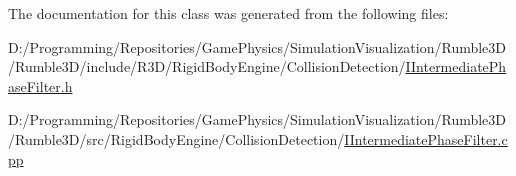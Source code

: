 The documentation for this class was generated from the following files\+:\begin{DoxyCompactItemize}
\item 
D\+:/\+Programming/\+Repositories/\+Game\+Physics/\+Simulation\+Visualization/\+Rumble3\+D/\+Rumble3\+D/include/\+R3\+D/\+Rigid\+Body\+Engine/\+Collision\+Detection/\mbox{\hyperlink{_i_intermediate_phase_filter_8h}{I\+Intermediate\+Phase\+Filter.\+h}}\item 
D\+:/\+Programming/\+Repositories/\+Game\+Physics/\+Simulation\+Visualization/\+Rumble3\+D/\+Rumble3\+D/src/\+Rigid\+Body\+Engine/\+Collision\+Detection/\mbox{\hyperlink{_i_intermediate_phase_filter_8cpp}{I\+Intermediate\+Phase\+Filter.\+cpp}}\end{DoxyCompactItemize}
